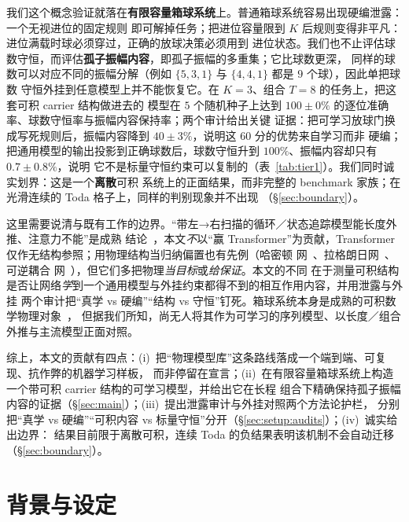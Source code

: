 \documentclass[11pt]{article}
\theoremstyle{definition}
\theoremstyle{plain}
\begin{document}
我们这个概念验证就落在\textbf{有限容量箱球系统}上。普通箱球系统容易出现硬编泄露：一个无视进位的固定规则
即可解掉任务；把进位容量限到 $K$ 后规则变得非平凡：进位满载时球必须穿过，正确的放球决策必须用到
进位状态。我们也不止评估球数守恒，而评估\textbf{孤子振幅内容}，即孤子振幅的多重集；它比球数更深，
同样的球数可以对应不同的振幅分解（例如 $\{5,3,1\}$ 与 $\{4,4,1\}$ 都是 $9$ 个球），因此单把球数
守恒外挂到任意模型上并不能恢复它。在 $K=3$、组合 $T=8$ 的任务上，把这套可积 carrier 结构做进去的
模型在 $5$ 个随机种子上达到 $100\pm0\%$ 的逐位准确率、球数守恒率与振幅内容保持率；两个审计给出关键
证据：把可学习放球门换成写死规则后，振幅内容降到 $40\pm3\%$，说明这 $60$ 分的优势来自学习而非
硬编；把通用模型的输出投影到正确球数后，球数守恒升到 $100\%$、振幅内容却只有 $0.7\pm0.8\%$，说明
它不是标量守恒约束可以复制的（表~\ref{tab:tier1}）。我们同时诚实划界：这是一个\textbf{离散}可积
系统上的正面结果，而非完整的 benchmark 家族；在光滑连续的 Toda 格子上，同样的判别现象并不出现
（\S\ref{sec:boundary}）。

这里需要说清与既有工作的边界。“带左→右扫描的循环／状态追踪模型能长度外推、注意力不能”是成熟
结论~\citep{liu2023transformers, merrill2023parallelism, merrill2024illusion}，本文\emph{不}以“赢
Transformer”为贡献，Transformer 仅作无结构参照；用物理结构当归纳偏置也有先例（哈密顿
网~\citep{greydanus2019hamiltonian}、拉格朗日网~\citep{cranmer2020lagrangian}、可逆耦合
网~\citep{dinh2014nice, dinh2016density}），但它们多把物理\emph{当目标}或\emph{给保证}。本文的不同
在于测量可积结构是否让网络\emph{学}到一个通用模型与外挂约束都得不到的相互作用内容，并用泄露与外挂
两个审计把“真学 vs 硬编”“结构 vs 守恒”钉死。箱球系统本身是成熟的可积数学物理对象~\citep{takahashi1990soliton}，
但据我们所知，尚无人将其作为可学习的序列模型、以长度／组合外推与主流模型正面对照。

综上，本文的贡献有四点：(i)~把“物理模型库”这条路线落成一个端到端、可复现、抗作弊的机器学习样板，
而非停留在宣言；(ii)~在有限容量箱球系统上构造一个带可积 carrier 结构的可学习模型，并给出它在长程
组合下精确保持孤子振幅内容的证据（\S\ref{sec:main}）；(iii)~提出泄露审计与外挂对照两个方法论护栏，
分别把“真学 vs 硬编”“可积内容 vs 标量守恒”分开（\S\ref{sec:setup:audits}）；(iv)~诚实给出边界：
结果目前限于离散可积，连续 Toda 的负结果表明该机制不会自动迁移（\S\ref{sec:boundary}）。

\section{背景与设定}\label{sec:setup}
\end{document}
